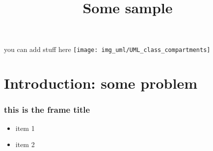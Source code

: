 
\title{Some sample}




\begin{frame}
\titlepage
\begin{center}

you can add stuff here
\texttt{[image: img\_uml/UML\_class\_compartments]}
\end{center}

\end{frame}

\section{Introduction: some problem}


\begin{frame}
\frametitle{this is the frame title}


\begin{itemize}[<+->]
\item item 1
\item item 2

\end{itemize}
\end{frame}



